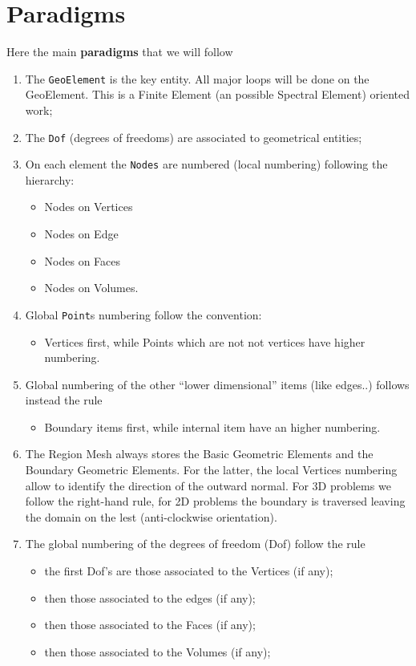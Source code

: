 \section{Paradigms}
\label{sec:paradigms}
Here the  main \textbf{paradigms} that we will follow
\begin{enumerate}
\item The \texttt{GeoElement} is the key entity. All major loops will
  be done on the GeoElement. This is a Finite Element (an possible
  Spectral Element) oriented work;
\item The \texttt{Dof} (degrees of freedoms) are associated to
  geometrical entities;
\item On each element the \texttt{Nodes} are numbered (local
  numbering) following the hierarchy:
\begin{itemize}
\item Nodes on Vertices
\item Nodes on Edge
\item Nodes on Faces
\item Nodes on Volumes.
\end{itemize}
\item Global \texttt{Point}s numbering follow the convention:
\begin{itemize}
\item Vertices first, while Points which are not not vertices have higher numbering.
\end{itemize}
\item Global numbering of the other ``lower dimensional'' items (like
  edges..)  follows instead the rule
\begin{itemize}
\item Boundary items first, while internal item have an higher numbering.
\end{itemize}
\item The Region Mesh always stores the Basic Geometric Elements and
  the Boundary Geometric Elements. For the latter, the local Vertices
  numbering allow to identify the direction of the outward normal. For
  3D problems we follow the right-hand rule, for 2D problems the
  boundary is traversed leaving the domain on the lest (anti-clockwise
  orientation).
\item The global numbering of the degrees of freedom (Dof) follow the
  rule
\begin{itemize}
\item  the first Dof's are those associated to the Vertices (if any);
\item then those associated to the edges (if any);
\item then those associated to the Faces (if any);
\item then those associated to the Volumes (if any);
\end{itemize}
\end{enumerate}

